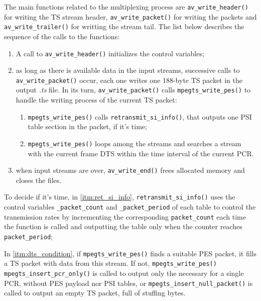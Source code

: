 \documentclass[
	12pt,				%
	openright,			%
	twoside,			%
	a4paper,			%
	brazil,
	french,				%
	english
	]{abntex2}
\begin{document}

The main functions related to the multiplexing process are \texttt{av\_write\_header()} for writing the TS stream header, \texttt{av\_write\_packet()} for writing the packets and \texttt{av\_write\_trailer()} for writting the stream tail. The list below describes the sequence of the calls to the functions:

\begin{enumerate}
	\item{A call to \texttt{av\_write\_header()} initializes the control variables;}
	\item{as long as there is available data in the input streams, successive calls to \texttt{av\_write\_packet()} occur, each one writes one 188-byte TS packet in the output \textit{.ts} file. In its turn, \texttt{av\_write\_packet()} calls \texttt{mpegts\_write\_pes()} to handle the writing process of the current TS packet:}
	\begin{enumerate}
		\item {\label{itm:ret_si_info} \texttt{mpegts\_write\_pes()} calls  \texttt{retransmit\_si\_info()}, that outputs one PSI table section in the packet, if it's time;}
		\item {\label{itm:dts_condition} \texttt{mpegts\_write\_pes()} loops among the streams and searches a stream with the current frame DTS within the time interval of the current PCR.}
	\end{enumerate}
	\item{when input streams are over, \texttt{av\_write\_end()} frees allocated memory and closes the files.}
\end{enumerate}

To decide if it's time, in \autoref{itm:ret_si_info}, \texttt{retransmit\_si\_info()} uses the control variables \texttt{\*\_packet\_count} and \texttt{\*\_packet\_period} of each table to control the transmission rates by incrementing the corresponding \texttt{packet\_count} each time the function is called and outputting the table only when the counter reaches \texttt{packet\_period};

In \autoref{itm:dts_condition}, if \texttt{mpegts\_write\_pes()} finds a suitable PES packet, it fills a TS packet with data from this stream. If not, \texttt{mpegts\_write\_pes()} \texttt{mpegts\_insert\_pcr\_only()} is called to output only the necessary for a single PCR, without PES payload nor PSI tables, or \texttt{mpegts\_insert\_null\_packet()} is called to output an empty TS packet, full of stuffing bytes.
\end{document}

